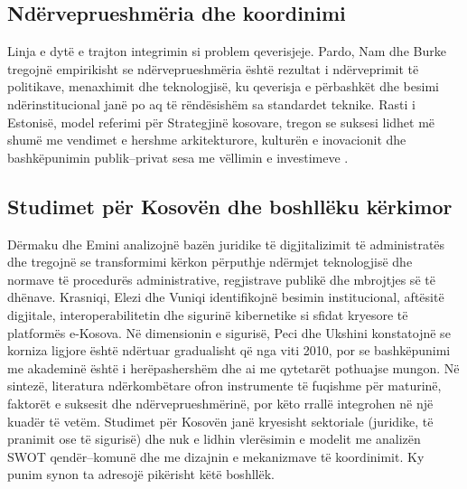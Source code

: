 \documentclass[conference]{IEEEtran}
\begin{document}
\subsection{Ndërveprueshmëria dhe koordinimi}
Linja e dytë e trajton integrimin si problem qeverisjeje. Pardo, Nam dhe
Burke \cite{pardo2012} tregojnë empirikisht se ndërveprueshmëria është
rezultat i ndërveprimit të politikave, menaxhimit dhe teknologjisë, ku
qeverisja e përbashkët dhe besimi ndërinstitucional janë po aq të
rëndësishëm sa standardet teknike. Rasti i Estonisë, model referimi për
Strategjinë kosovare, tregon se suksesi lidhet më shumë me vendimet e hershme
arkitekturore, kulturën e inovacionit dhe bashkëpunimin publik--privat sesa
me vëllimin e investimeve \cite{kalvet2012}.

\subsection{Studimet për Kosovën dhe boshllëku kërkimor}
Dërmaku dhe Emini \cite{dermaku2024} analizojnë bazën juridike të
digjitalizimit të administratës dhe tregojnë se transformimi kërkon
përputhje ndërmjet teknologjisë dhe normave të procedurës administrative,
regjistrave publikë dhe mbrojtjes së të dhënave. Krasniqi, Elezi dhe Vuniqi
\cite{krasniqi2026} identifikojnë besimin institucional, aftësitë digjitale,
interoperabilitetin dhe sigurinë kibernetike si sfidat kryesore të
platformës e-Kosova. Në dimensionin e sigurisë, Peci dhe Ukshini
\cite{kipred2022} konstatojnë se korniza ligjore është ndërtuar gradualisht
që nga viti 2010, por se bashkëpunimi me akademinë është i herëpashershëm
dhe ai me qytetarët pothuajse mungon. Në sintezë, literatura ndërkombëtare ofron instrumente
të fuqishme për maturinë, faktorët e suksesit dhe ndërveprueshmërinë, por
këto rrallë integrohen në një kuadër të vetëm. Studimet për Kosovën janë
kryesisht sektoriale (juridike, të pranimit ose të sigurisë) dhe nuk e lidhin
vlerësimin e modelit me analizën SWOT qendër--komunë dhe me dizajnin e
mekanizmave të koordinimit. Ky punim synon ta adresojë pikërisht këtë
boshllëk.
\end{document}
